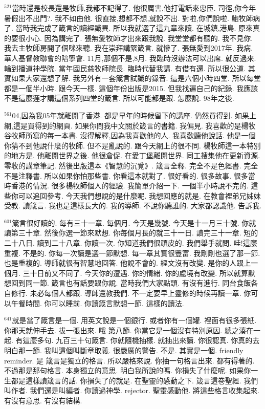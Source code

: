 \documentclass{book}
\begin{document}
$^{521}$當時還是校長還是牧師,我都不記得了.
他很厲害,他打電話來忠臣.
司徑,你今年暑假出不出門?.
我不如由他.
很直接,想都不想,就說不出.
對啦,你們說啦.
鮑牧師病了.
當時我完成了箴言的讀經識異.
所以我就選了這九章來讀.
在城鎮,港島.
原來真的要很小心.
因為講完了.
張無愛牧師才出來跟我說.
我堂堂都有聽的.
我不見你.
我去主牧師房開了個咪來聽.
我在崇拜講緊箴言.
就慘了.
張無愛到2017年.
我病.
華人基督教聯會的陪寧會.
11月,那個不是,8月.
我臨時沒辦法可以出席.
就反過來.
輪到播道神學院.
當年國民慈牧師院長.
臨時代替我講.
有借有還.
所以很公道.
其實如果大家還想了解.
我另外有一套箴言試識的錄音.
這是六個小時四堂.
所以每堂都是一個半小時.
跟今天一樣.
這個年份出版是2015.
但我找遍自己的紀錄.
我應該不是這麼遲才講這個系列四堂的箴言.
所以可能都是跟.
怎麼說.
98年之後.

$^{561}$04,因為我05年就離開了香港.
都是早年的時候留下的講座.
仍然買得到.
如果上網,這是買得到的網頁.
如果你問我中文關於箴言的書籍.
我偏見.
我喜歡的是楊牧谷牧師所寫的每一本書.
沒得解釋,因為我喜歡他的人.
我喜歡聽他說話.
他是一個你猜不到他說什麼的牧師.
但不是亂說的.
跟今天網上的很不同.
楊牧師這一本特別的地方是.
他離開世界之後.
他很倉促.
在愛丁堡離開世界.
同工搜集他在更新資源.
零收的講章筆記.
然後出版這本《智慧的沉覓》.
箴言全釋.
完全不是色經書.
完全不是注釋書.
所以如果你怕那些書.
你看這本就對了.
很好看的.
很多故事.
很多當時香港的情況.
很多楊牧師個人的經驗.
我簡單介紹一下.
一個半小時說不完的.
這些你可以追回參考.
今天我們想說的是什麼呢.
我想回應的就是.
在教會裡弟兄姊妹受教.
讀箴言.
我也是這樣長大的.
我的導師.
不說你聽誰的.
大家都認識他.
告訴我.

$^{601}$箴言很好讀的.
每有三十一章.
每個月.
今天是幾號.
今天是十一月三十號.
你就讀第三十章.
然後你選一節來默想.
你每個月長的就三十一日.
讀完三十一章.
短的二十八日.
讀到二十八章.
你讀一次.
你知道我們很頑皮的.
我們舉手就問.
哇!這麼重複.
不是的.
你每一次讀是選一節默想.
每一章其實很豐富.
我剛剛也選了那一節.
也是重複的.
導師就很有智慧地回答.
他說不會的.
經文沒有改變.
是你的人跟上一個月.
三十日前又不同了.
今天你的遭遇.
你的情緒.
你的處境有改變.
所以就算默想回到同一節.
箴言也有話要跟你說.
當時我們大家點頭.
有沒有進行.
同台食飯各自修行.
未必每個人都跟.
導師還教我們.
不一定要早上靈修的時候再讀一章.
你可以午餐時間.
你可以睡前.
你讀箴言默想一節.
這樣的讀法.

$^{641}$就是當了箴言是一個.
用英文說是一個銀行.
或者你有一個罐.
裡面有很多張紙.
你那天就伸手去.
拔一張出來.
哦 第八節.
你當它是一個沒有特別原因.
總之湊在一起.
有這麼多句.
九百三十句箴言.
你就隨機抽樣.
就抽出來讀.
你很認真.
你真的去明白那一節.
我叫這個叫斷章取義.
很嚴厲的警告.
不是.
其實是一個.
friendly reminder.
是 箴言是獨立的格言.
所以嚴格來說.
你抽一句格言出來.
都有得著的.
不過那是那句格言.
本身獨立的意思.
明白我所說的嗎.
你損失了什麼呢.
如果你一生都是這樣讀箴言的話.
你損失了的就是.
在聖靈的感動之下.
箴言這卷聖經.
我們叫作者.
我們還是叫編者.
你讀過神學.
rejector.
聖靈感動他.
將這些格言收集起來.
有沒有意思.
有沒有結構.
\end{document}
